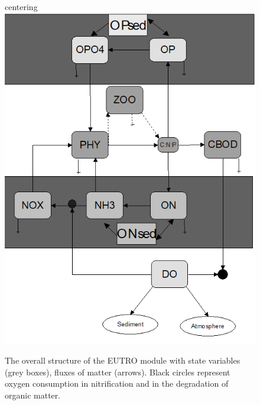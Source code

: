 \begin{figure}[htbp]
centering
\includegraphics[scale=1]{eutro.png}
\caption{The overall structure of the EUTRO module with state variables (grey boxes), fluxes of matter (arrows). Black circles represent oxygen consumption in nitrification and in the degradation of organic matter. }
\label{eutro_scheme}
\end{figure}

